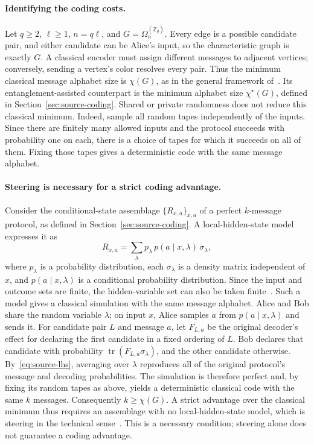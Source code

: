 \documentclass[11pt,a4paper]{article}
\numberwithin{equation}{section}
\numberwithin{figure}{section}
\numberwithin{table}{section}
\numberwithin{footnote}{section}
\theoremstyle{informal}\newtheorem*{informaltheorem}{Informal theorem}
\theoremstyle{definition}\newtheorem{example}{Example}[section]
\theoremstyle{remark}\newtheorem{remark}[theorem]{Remark}
\newcommand{\Z}{\mathbb Z}
\newcommand{\chs}{\chi^{\star}}
\newcommand{\Om}{\Omega_n^{(\Z_q)}}
\newcommand{\tr}{\operatorname{tr}}
\begin{document}
\paragraph{Identifying the coding costs.}
Let \(q\geq2\), \(\ell\geq1\), \(n=q\ell\), and \(G=\Om\).
Every edge is a possible candidate pair, and either
candidate can be Alice's input, so the characteristic graph is exactly
\(G\). A classical encoder must assign different messages to adjacent
vertices; conversely, sending a vertex's color resolves every pair.
Thus the minimum classical message alphabet size is \(\chi(G)\), as in
the general framework of~\cite[Sec.~1.1]{bblps}. Its
entanglement-assisted counterpart is the minimum alphabet size
\(\chs(G)\), defined in
Section~\ref{sec:source-coding}.
Shared or private randomness does not reduce this classical minimum.
Indeed, sample all random tapes independently of the inputs. Since
there are finitely many allowed inputs and the protocol succeeds
with probability one on each, there is a choice of tapes for which
it succeeds on all of them. Fixing those tapes gives a deterministic
code with the same message alphabet.

\paragraph{Steering is necessary for a strict coding advantage.}
Consider the conditional-state assemblage \(\{R_{x,a}\}_{x,a}\)
of a perfect \(k\)-message protocol, as defined in
Section~\ref{sec:source-coding}.
A local-hidden-state model expresses it as
\begin{equation}\label{eq:source-lhs}
 R_{x,a}=\sum_\lambda p_\lambda\,p(a\mid x,\lambda)\,
 \sigma_\lambda,
\end{equation}
where \(p_\lambda\) is a probability distribution, each
\(\sigma_\lambda\) is a density matrix independent of \(x\),
and \(p(a\mid x,\lambda)\) is a conditional probability
distribution. Since the input and outcome sets are finite, the
hidden-variable set can also be taken finite~\cite[Secs.~II and III.A]{cs-steering}.
Such a model gives a classical simulation with the same message
alphabet. Alice and Bob share the random variable \(\lambda\);
on input \(x\), Alice samples \(a\) from \(p(a\mid x,\lambda)\)
and sends it. For candidate pair \(L\) and message \(a\), let
\(F_{L,a}\) be the original decoder's effect for declaring the
first candidate in a fixed ordering of \(L\). Bob declares that
candidate with probability \(\tr(F_{L,a}\sigma_\lambda)\), and
the other candidate otherwise. By~\eqref{eq:source-lhs}, averaging
over \(\lambda\) reproduces all of the original protocol's
message and decoding probabilities. The simulation is therefore
perfect and, by fixing its random tapes as above, yields a
deterministic classical code with the same \(k\) messages.
Consequently \(k\geq\chi(G)\). A strict advantage over the
classical minimum thus requires an assemblage with no
local-hidden-state model, which is steering in the technical
sense~\cite[Sec.~II.A]{cs-steering}. This is a necessary condition;
steering alone does not guarantee a coding advantage.
\end{document}

